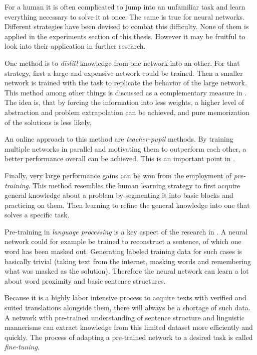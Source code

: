 For a human it is often complicated to jump into an unfamiliar task and learn everything necessary to solve it at once.
The same is true for neural networks. 
Different strategies have been devised to combat this difficulty. 
None of them is applied in the experiments section of this thesis. 
However it may be fruitful to look into their application in further research. 

One method is to \emph{distill} knowledge from one network into an other. 
For that strategy, first a large and expensive network could be trained.
Then a smaller network is trained with the task to replicate the behavior of the large network. 
This method among other things is discussed as a complementary measure in \cite{mobileNetPaper}.
The idea is, that by forcing the information into less weights, a higher level of abstraction and problem extrapolation can be achieved, and pure memorization of the solutions is less likely.

An \glqq online\grqq{} approach to this method are \emph{teacher-pupil} methods. 
By training multiple networks in parallel and motivating them to outperform each other, a better performance overall can be achieved. This is an important point in \cite{dinoPaper}.

Finally, very large performance gains can be won from the employment of \emph{pre-training}.
This method resembles the human learning strategy to first acquire general knowledge about a problem by segmenting it into basic blocks and practicing on them.
Then learning to refine the general knowledge into one that solves a specific task.

Pre-training in \emph{language processing} is a key aspect of the research in \cite{bertPaper}.
A neural network could for example be trained to reconstruct a sentence, of which one word has been masked out.
Generating labeled training data for such cases is basically trivial (taking text from the internet, masking words and remembering what was masked as the solution). 
Therefore the neural network can learn a lot about word proximity and basic sentence structures.

Because it is a highly labor intensive process to acquire texts with verified and suited translations alongside them, there will always be a shortage of such data.
A network with pre-trained understanding of sentence structure and linguistic mannerisms can extract knowledge from this limited dataset more efficiently and quickly.
The process of adapting a pre-trained network to a desired task is called \emph{fine-tuning}.

